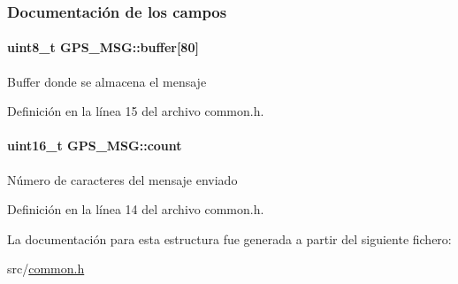 \subsubsection{Documentación de los campos}
\hypertarget{structGPS__MSG_ac486c996a8a7a5edd1752baaea5b4571}{
\paragraph[{buffer}]{\setlength{\rightskip}{0pt plus 5cm}uint8\+\_\+t G\+P\+S\+\_\+\+M\+S\+G\+::buffer\mbox{[}80\mbox{]}}}\label{structGPS__MSG_ac486c996a8a7a5edd1752baaea5b4571}
Buffer donde se almacena el mensaje 

Definición en la línea 15 del archivo common.\+h.

\hypertarget{structGPS__MSG_a4f0c127ec8708885192496df14c31a71}{
\paragraph[{count}]{\setlength{\rightskip}{0pt plus 5cm}uint16\+\_\+t G\+P\+S\+\_\+\+M\+S\+G\+::count}}\label{structGPS__MSG_a4f0c127ec8708885192496df14c31a71}
Número de caracteres del mensaje enviado 

Definición en la línea 14 del archivo common.\+h.



La documentación para esta estructura fue generada a partir del siguiente fichero\+:\begin{DoxyCompactItemize}
\item 
src/\hyperlink{common_8h}{common.\+h}\end{DoxyCompactItemize}
